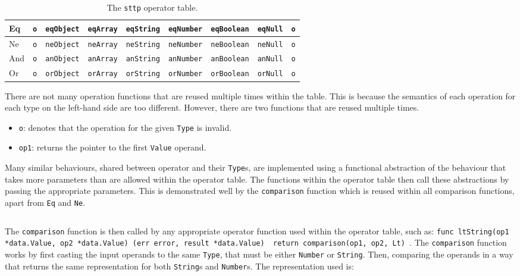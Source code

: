 \begin{table}[H]
\begin{tabular}{|l|l|l|l|l|l|l|l|l|}
    Eq                                              & \verb|o| & \verb|eqObject| & \verb|eqArray| & \verb|eqString| & \verb|eqNumber| & \verb|eqBoolean| & \verb|eqNull| & \verb|o| \\ \hline
    Ne                                              & \verb|o| & \verb|neObject| & \verb|neArray| & \verb|neString| & \verb|neNumber| & \verb|neBoolean| & \verb|neNull| & \verb|o| \\ \hline
    And                                             & \verb|o| & \verb|anObject| & \verb|anArray| & \verb|anString| & \verb|anNumber| & \verb|anBoolean| & \verb|anNull| & \verb|o| \\ \hline
    Or                                              & \verb|o| & \verb|orObject| & \verb|orArray| & \verb|orString| & \verb|orNumber| & \verb|orBoolean| & \verb|orNull| & \verb|o| \\ \hline
    \end{tabular}
    \cprotect\caption{The \verb|sttp| operator table.}
\end{table}

There are not many operation functions that are reused multiple times within the table. This is because the semantics of each operation for each type on the left-hand side are too different. However, there are two functions that are reused multiple times.

\begin{itemize}
    \item \verb|o|: denotes that the operation for the given \verb|Type| is invalid.
    \item \verb|op1|: returns the pointer to the first \verb|Value| operand.
\end{itemize}

Many similar behaviours, shared between operator and their \verb|Type|s, are implemented using a functional abstraction of the behaviour that takes more parameters than are allowed within the operator table. The functions within the operator table then call these abstractions by passing the appropriate parameters. This is demonstrated well by the \verb|comparison| function which is reused within all comparison functions, apart from \verb|Eq| and \verb|Ne|.

\inputminted[firstline=544, lastline=607, autogobble, breaklines, breakafter=., tabsize=4]{go}{../../src/eval/op_funcs.go}

The \verb|comparison| function is then called by any appropriate operator function used within the operator table, such as: \texttt{func ltString(op1 *data.Value, op2 *data.Value) (err error, result *data.Value) { return comparison(op1, op2, Lt) }}. The \verb|comparison| function works by first casting the input operands to the same \verb|Type|, that must be either \verb|Number| or \verb|String|. Then, comparing the operands in a way that returns the same representation for both \verb|String|s and \verb|Number|s. The representation used is:

